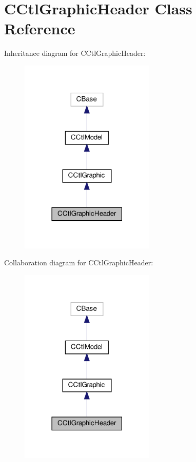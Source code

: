 \hypertarget{classCCtlGraphicHeader}{}\section{C\+Ctl\+Graphic\+Header Class Reference}
\label{classCCtlGraphicHeader}


Inheritance diagram for C\+Ctl\+Graphic\+Header\+:
\nopagebreak
\begin{figure}[H]
\begin{center}
\leavevmode
\includegraphics[width=182pt]{classCCtlGraphicHeader__inherit__graph}
\end{center}
\end{figure}


Collaboration diagram for C\+Ctl\+Graphic\+Header\+:
\nopagebreak
\begin{figure}[H]
\begin{center}
\leavevmode
\includegraphics[width=182pt]{classCCtlGraphicHeader__coll__graph}
\end{center}
\end{figure}
